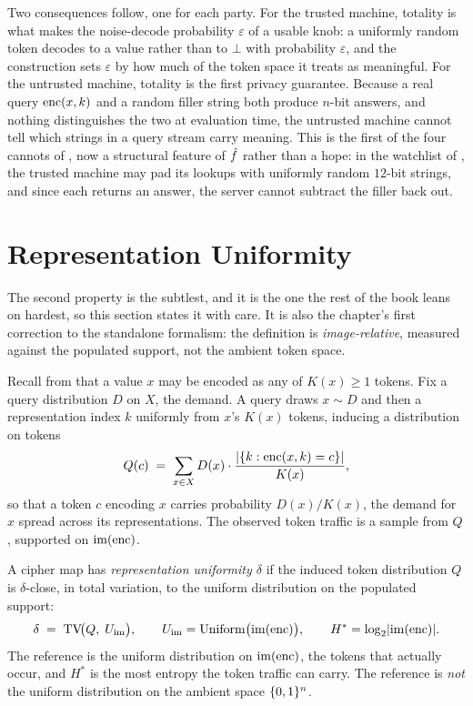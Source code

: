 Two consequences follow, one for each party. For the trusted machine,
totality is what makes the noise-decode probability $\varepsilon$ of
 a usable knob: a uniformly random token decodes
to a value rather than to $\bot$ with probability $\varepsilon$, and the
construction sets $\varepsilon$ by how much of the token space it treats as
meaningful. For the untrusted machine, totality is the first privacy
guarantee. Because a real query $\operatorname{enc}(x, k)$ and a random filler string both
produce $n$-bit answers, and nothing distinguishes the two at evaluation
time, the untrusted machine cannot tell which strings in a query stream
carry meaning. This is the first of the four cannots of
, now a structural feature of $\hat{f}$ rather than a
hope: in the watchlist of , the trusted machine
may pad its lookups with uniformly random $12$-bit strings, and since each
returns an answer, the server cannot subtract the filler back out.

\section{Representation Uniformity}
\label{sec:uniformity}

The second property is the subtlest, and it is the one the rest of the book
leans on hardest, so this section states it with care. It is also the
chapter's first correction to the standalone formalism: the definition is
\emph{image-relative}, measured against the populated support, not the
ambient token space.

Recall from  that a value $x$ may be encoded as any of
$K(x) \geq 1$ tokens. Fix a query distribution $D$ on $X$, the demand. A
query draws $x \sim D$ and then a representation index $k$ uniformly from
$x$'s $K(x)$ tokens, inducing a distribution on tokens
\[
  Q(c) \;=\; \sum_{x \in X} D(x) \cdot
             \frac{\lvert \{k : \operatorname{enc}(x, k) = c\} \rvert}{K(x)},
\]
so that a token $c$ encoding $x$ carries probability $D(x)/K(x)$, the demand
for $x$ spread across its representations. The observed token traffic is a
sample from $Q$, supported on $\mathrm{im}(\operatorname{enc})$.

\begin{definition}
\label{def:uniformity}
A cipher map has \emph{representation uniformity $\delta$} if the induced
token distribution $Q$ is $\delta$-close, in total variation, to the uniform
distribution on the populated support:
\[
  \delta \;=\; \operatorname{TV}\!\bigl(Q,\; U_{\mathrm{im}}\bigr),
  \qquad
  U_{\mathrm{im}} = \mathrm{Uniform}\bigl(\mathrm{im}(\operatorname{enc})\bigr),
  \qquad
  H^{*} = \log_2 \lvert \mathrm{im}(\operatorname{enc}) \rvert .
\]
The reference is the uniform distribution on $\mathrm{im}(\operatorname{enc})$, the tokens
that actually occur, and $H^{*}$ is the most entropy the token traffic can
carry. The reference is \emph{not} the uniform distribution on the ambient
space $\{0,1\}^n$.
\end{definition}


